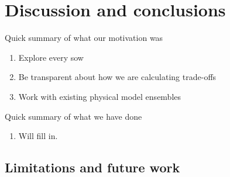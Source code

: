 \documentclass[11pt]{article}
\begin{document}
\section{Discussion and conclusions}\label{sec:conclusions}

Quick summary of what our motivation was
\begin{enumerate}
    \item Explore every \gls{sow}
    \item Be transparent about how we are calculating trade-offs
    \item Work with existing physical model ensembles
\end{enumerate}
Quick summary of what we have done
\begin{enumerate}
    \item Will fill in.
\end{enumerate}

\subsection{Limitations and future work}
\end{document}
